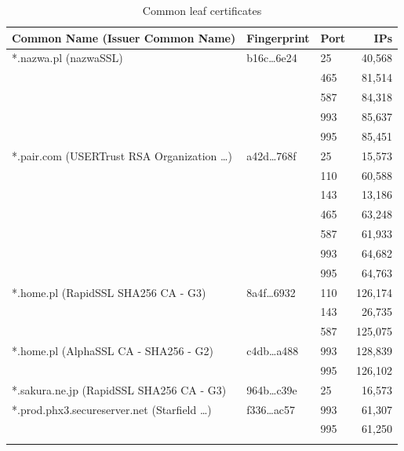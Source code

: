 \documentclass[14pt,aspectratio=43]{beamer}
\begin{document}
\begin{frame}
  \begin{center}
\tiny
\begin{table}[]
\centering
\begin{tabular}{lllr}
\hline
Common Name (Issuer Common Name) & Fingerprint & Port & IPs \\
\hline
*.nazwa.pl (nazwaSSL)               & b16c\ldots6e24 & 25 &  40,568 \\
                                                &                & 465 & 81,514 \\
                                                &                & 587 & 84,318 \\
                                                &                & 993 & 85,637 \\
                                                &                & 995 & 85,451 \\
\hline
*.pair.com (USERTrust RSA Organization \ldots)  & a42d\ldots768f & 25 & 15,573  \\
                                                &                & 110 & 60,588 \\
                                          &                & 143 & 13,186 \\
                                                &                & 465 & 63,248 \\
                                                &                & 587 & 61,933 \\
                                                &                & 993 & 64,682 \\
                                                &                & 995 & 64,763 \\
\hline
*.home.pl (RapidSSL SHA256 CA - G3)             & 8a4f\ldots6932 & 110 & 126,174 \\
                                                &                & 143 & 26,735  \\
                                                &                & 587 & 125,075 \\
*.home.pl (AlphaSSL CA - SHA256 - G2)           & c4db{\ldots}a488 & 993 & 128,839  \\
                                                &                  & 995 & 126,102  \\
\hline
*.sakura.ne.jp (RapidSSL SHA256 CA - G3)        & 964b{\ldots}c39e & 25 & 16,573 \\
\hline 
*.prod.phx3.secureserver.net (Starfield \ldots) & f336{\ldots}ac57 & 993 & 61,307 \\
                                                &                  & 995 & 61,250 \\
\hline \\ 
\end{tabular}
\caption{Common leaf certificates}
\label{tab:common-certificates}
\end{table}

  \end{center}
\end{frame}
\end{document}
